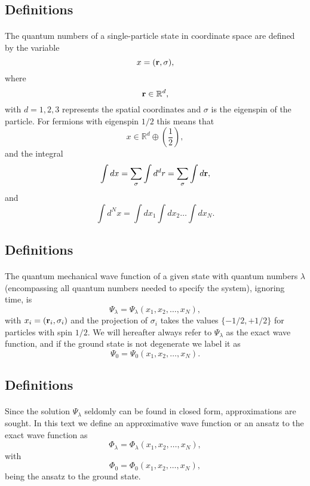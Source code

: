\documentclass[%
twoside,                 %
final,                   %
10pt]{article}
\begin{document}
\subsection{Definitions}

\paragraph{}
The quantum numbers of a single-particle state in coordinate space are
defined by the variable 
\[
x=({\bf r},\sigma), 
\]
where 
\[
{\bf r}\in {\mathbb{R}}^{d},
\]
with $d=1,2,3$ represents the spatial coordinates and $\sigma$ is the eigenspin of the particle. For fermions with eigenspin $1/2$ this means that
\[
 x\in {\mathbb{R}}^{d}\oplus (\frac{1}{2}),
\]
and the integral
\[
\int dx = \sum_{\sigma}\int d^dr = \sum_{\sigma}\int d{\bf r},
\]
and
\[
\int d^Nx= \int dx_1\int dx_2\dots\int dx_N.
\]




\subsection{Definitions}

\paragraph{}
The quantum mechanical wave function of a given state with quantum numbers $\lambda$ (encompassing all quantum numbers needed to specify the system), ignoring time, is
\[
\Psi_{\lambda}=\Psi_{\lambda}(x_1,x_2,\dots,x_N),
\]
with $x_i=({\bf r}_i,\sigma_i)$ and the projection of $\sigma_i$ takes the values
$\{-1/2,+1/2\}$ for particles with spin $1/2$. 
We will hereafter always refer to $\Psi_{\lambda}$ as the exact wave function, and if the ground state is not degenerate we label it as 
\[
\Psi_0=\Psi_0(x_1,x_2,\dots,x_N).
\]




\subsection{Definitions}

\paragraph{}
Since the solution $\Psi_{\lambda}$ seldomly can be found in closed form, approximations are sought. In this text we define an approximative wave function or an ansatz to the exact wave function as 
\[
\Phi_{\lambda}=\Phi_{\lambda}(x_1,x_2,\dots,x_N),
\]
with
\[
\Phi_0=\Phi_0(x_1,x_2,\dots,x_N),
\]
being the ansatz to the ground state.
\end{document}
